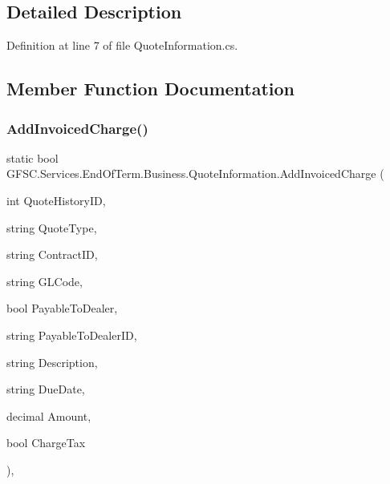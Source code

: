 \subsection{Detailed Description}


Definition at line 7 of file Quote\+Information.\+cs.



\subsection{Member Function Documentation}
\mbox{\label{class_g_f_s_c_1_1_services_1_1_end_of_term_1_1_business_1_1_quote_information_a6626649b8bb5656489ee90f1704e312a}} 
\subsubsection{\texorpdfstring{Add\+Invoiced\+Charge()}{AddInvoicedCharge()}}
{\footnotesize\ttfamily static bool G\+F\+S\+C.\+Services.\+End\+Of\+Term.\+Business.\+Quote\+Information.\+Add\+Invoiced\+Charge (\begin{DoxyParamCaption}\item[{int}]{Quote\+History\+ID,  }\item[{string}]{Quote\+Type,  }\item[{string}]{Contract\+ID,  }\item[{string}]{G\+L\+Code,  }\item[{bool}]{Payable\+To\+Dealer,  }\item[{string}]{Payable\+To\+Dealer\+ID,  }\item[{string}]{Description,  }\item[{string}]{Due\+Date,  }\item[{decimal}]{Amount,  }\item[{bool}]{Charge\+Tax }\end{DoxyParamCaption})\hspace{0.3cm}{\ttfamily [static]}, {\ttfamily [package]}}



